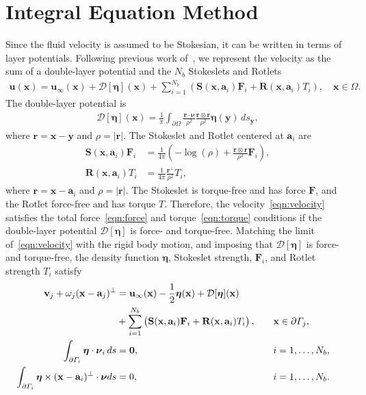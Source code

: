 \documentclass[lineno]{jfm}
\renewcommand{\aa}{\mathbf{a}}
\newcommand{\bd}{\partial}
\newcommand{\DD}{\mathcal{D}}
\newcommand{\eeta}{\boldsymbol{\eta}}
\newcommand{\FF}{\mathbf{F}}
\newcommand{\nnu}{\boldsymbol{\nu}}
\newcommand{\rr}{\mathbf{r}}
\newcommand{\RR}{\mathbf{R}}
\renewcommand{\SS}{\mathbf{S}}
\newcommand{\xx}{\mathbf{x}}
\newcommand{\uu}{\mathbf{u}}
\renewcommand{\vv}{\mathbf{v}}
\newcommand{\yy}{\mathbf{y}}
\begin{document}
\section{\label{IEM}Integral Equation Method}
Since the fluid velocity is assumed to be Stokesian, it can be written
in terms of layer potentials. Following previous work of~\cite{Lukas19},
we represent the velocity as the sum of a double-layer potential and the
$N_b$ Stokeslets and Rotlets
\begin{align}
  \label{eqn:velocity}
  \uu(\xx) = \uu_\infty(\xx) + \DD[\eeta](\xx) + 
    \sum_{i=1}^{N_b} \left(\SS(\xx,\aa_i) \FF_i + 
    \RR(\xx,\aa_i) T_i\right), \quad \xx \in \Omega.
\end{align}
The double-layer potential is
\begin{align}
  \DD[\eeta](\xx) = \frac{1}{\pi} \int_{\bd\Omega} 
    \frac{\rr \cdot \nnu}{\rho^2} \frac{\rr \otimes \rr}{\rho^2}
    \eeta(\yy) \, ds_\yy,
\end{align}
where $\rr = \xx - \yy$ and $\rho = |\rr|$. The Stokeslet and Rotlet
centered at $\aa_i$ are
\begin{align}
  \SS(\xx,\aa_i)\FF_i &= \frac{1}{4\pi} \left(-\log(\rho) + 
    \frac{\rr \otimes \rr}{\rho^2} \FF_i \right), \\
  \RR(\xx,\aa_i)T_i &= \frac{1}{4\pi} \frac{\rr^\perp}{\rho^2} T_i,
\end{align}
where $\rr = \xx - \aa_i$ and $\rho = |\rr|$. The Stokeslet is
torque-free and has force $\FF$, and the Rotlet force-free and has
torque $T$. Therefore, the velocity~\eqref{eqn:velocity} satisfies the
total force~\eqref{eqn:force} and torque~\eqref{eqn:torque} conditions
if the double-layer potential $\DD[\eeta]$ is force- and torque-free.
Matching the limit of~\eqref{eqn:velocity} with the rigid body motion,
and imposing that $\DD[\eeta]$ is force- and torque-free, the density
function $\eeta$, Stokeslet strength, $\FF_i$, and Rotlet strength $T_i$
satisfy
\begin{alignat}{3}
  \nonumber
  \vv_j + \omega_j (\xx - \aa_j)^\perp &= \uu_\infty(\xx)
    -\frac{1}{2} \eeta(\xx) + \DD[\eeta](\xx) \\
  \label{eqn:SKIE}
    &+ \sum_{i=1}^{N_b} 
    \left(\SS(\xx,\aa_i) \FF_i + \RR(\xx,\aa_i) T_i\right),
    \quad &&\xx \in \bd \Gamma_j, \\
  \label{eqn:mobility1}
  \int_{\bd\Gamma_i} \eeta \cdot \nnu_i \, ds &= {\bf 0}, 
  &&i = 1,\ldots,N_b, \\
  \label{eqn:mobility2}
  \int_{\bd\Gamma_i} \eeta\times(\xx-\aa_i)^\perp \cdot \nnu ds &= 0,
  &&i = 1,\ldots,N_b.
\end{alignat}
\end{document}
